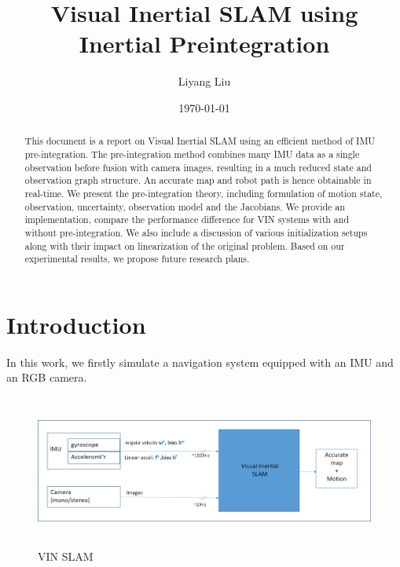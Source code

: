 \documentclass[12pt]{article}   %
\begin{document}


\title{Visual Inertial SLAM using Inertial Preintegration}
\author{Liyang Liu}
\date{\today}

\maketitle

\begin{abstract}
This document is a report on Visual Inertial SLAM using an efficient method of IMU pre-integration. The pre-integration method combines many IMU data as a single observation before fusion with camera images, resulting in a much reduced state and observation graph structure. An accurate map and robot path is hence obtainable in real-time. We present the pre-integration theory, including formulation of motion state, observation, uncertainty, observation model and the Jacobians. We provide an implementation, compare the performance difference for VIN systems with and without pre-integration. We also include a discussion of various initialization setups along with their impact on linearization of the original problem. Based on our experimental results, we propose future research plans.
\end{abstract}

\newpage

\tableofcontents

\newpage

\section{Introduction}

\vspace{1cm}
In this work, we firstly simulate a navigation system equipped with an IMU and an RGB camera. 
\begin{figure}[ht]
	\includegraphics[height=5cm]{figures/VIN_block-diagram.png}
	\caption{VIN SLAM}
	\label{fig:vin}
\end{figure}
\end{document}
